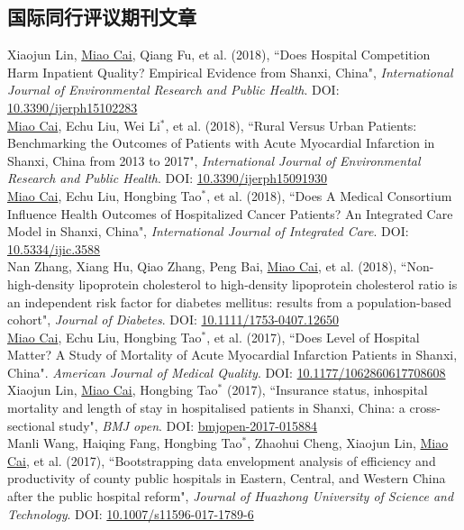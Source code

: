 \documentclass[11pt, a4paper]{article}
\newcommand{\years}[1]{\marginnote{\scriptsize #1}}
\begin{document}
\subsection*{国际同行评议期刊文章}
\noindent
\years{2018}Xiaojun Lin, \underline{Miao Cai}, Qiang Fu, et al. (2018), ``Does Hospital Competition Harm Inpatient Quality? Empirical Evidence from Shanxi, China", \emph{International Journal of Environmental Research and Public Health}. DOI: \href{https://doi.org/10.3390/ijerph15102283}{10.3390/ijerph15102283}\\
\years{2018}\underline{Miao Cai}, Echu Liu, Wei Li$^\ast$, et al. (2018), ``Rural Versus Urban Patients: Benchmarking the Outcomes of Patients with Acute Myocardial Infarction in Shanxi, China from 2013 to 2017", \emph{International Journal of Environmental Research and Public Health}. DOI: \href{https://doi.org/10.3390/ijerph15091930}{10.3390/ijerph15091930}\\
\years{2018}\underline{Miao Cai}, Echu Liu, Hongbing Tao$^\ast$, et al. (2018), ``Does A Medical Consortium Influence Health Outcomes of Hospitalized Cancer Patients? An Integrated Care Model in Shanxi, China", \emph{International Journal of Integrated Care}. DOI: \href{https://doi.org/10.5334/ijic.3588}{10.5334/ijic.3588}\\
\years{2018}Nan Zhang, Xiang Hu, Qiao Zhang, Peng Bai, \underline{Miao Cai}, et al. (2018), ``Non-high-density lipoprotein cholesterol to high-density lipoprotein cholesterol ratio is an independent risk factor for diabetes mellitus: results from a population-based cohort", \emph{Journal of Diabetes}. DOI: \href{https://doi.org/10.1111/1753-0407.12650}{10.1111/1753-0407.12650}\\
\years{2017}\underline{Miao Cai}, Echu Liu, Hongbing Tao$^\ast$, et al. (2017), ``Does Level of Hospital Matter? A Study of Mortality of Acute Myocardial Infarction Patients in Shanxi, China". \emph{American Journal of Medical Quality}. DOI: \href{https://doi.org/10.1177/1062860617708608}{10.1177/1062860617708608}\\
\years{2017}Xiaojun Lin, \underline{Miao Cai}, Hongbing Tao$^\ast$ (2017), ``Insurance status, inhospital mortality and length of stay in hospitalised patients in Shanxi, China: a cross-sectional study", \emph{BMJ open}. DOI: \href{https://doi.org/10.1136/bmjopen-2017-015884}{bmjopen-2017-015884}\\
\years{2017}Manli Wang, Haiqing Fang, Hongbing Tao$^\ast$, Zhaohui Cheng, Xiaojun Lin, \underline{Miao Cai}, et al. (2017), ``Bootstrapping data envelopment analysis of efficiency and productivity of county public hospitals in Eastern, Central, and Western China after the public hospital reform", \emph{Journal of Huazhong University of Science and Technology}. DOI: \href{https://doi.org/10.1007/s11596-017-1789-6}{10.1007/s11596-017-1789-6}\\
\end{document}
